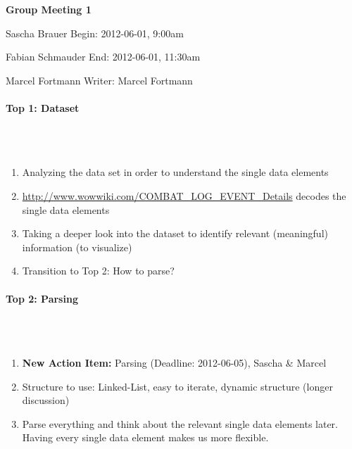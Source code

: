 \documentclass{scrartcl}
\begin{document}
\clearpage

\begin{center}
{\huge \textbf{Group Meeting 1}}\\
\end{center}
\begin{description}
\item Sascha Brauer \hfill Begin: 2012-06-01, 9:00am 
\item Fabian Schmauder \hfill End: 2012-06-01, 11:30am
\item Marcel Fortmann \hfill Writer: Marcel Fortmann
\end{description}

\paragraph{Top 1: Dataset}
\hfill \\ \hfill \\
\begin {enumerate}
\item Analyzing the data set in order to understand the single data elements
\item \url{http://www.wowwiki.com/COMBAT_LOG_EVENT_Details} decodes the single data elements
\item Taking a deeper look into the dataset to identify relevant (meaningful) information (to visualize)
\item Transition to Top 2: How to parse?
\end {enumerate}

\paragraph{Top 2: Parsing}
\hfill \\ \hfill \\
\begin {enumerate}
\item \textbf{New Action Item:} Parsing (Deadline: 2012-06-05), Sascha \& Marcel
\item Structure to use: Linked-List, easy to iterate, dynamic structure (longer discussion)
\item Parse everything and think about the relevant single data elements later. Having every single data element makes us more flexible.
\end {enumerate}
\end{document}
